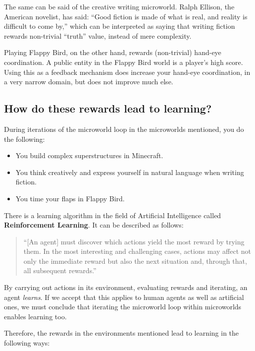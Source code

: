 The same can be said of the creative writing microworld. Ralph Ellison, the American novelist, has said: ``Good
fiction is made of what is real, and reality is difficult to come by,''
which can be interpreted as saying that writing fiction rewards non-trivial ``truth'' value, instead of mere complexity.

Playing Flappy Bird, on the other hand, rewards (non-trivial) hand-eye coordination. A public entity in the
Flappy Bird world is a player's high score. Using this as a
feedback mechanism does increase your hand-eye coordination, in a very narrow domain,
but does not improve much else. 

\subsection{How do these rewards lead to learning?}

During iterations of the microworld loop in the microworlds mentioned, you do the following:

\begin{itemize}

\item You build complex superstructures in Minecraft\cite{local:minecraft}.
\item You think creatively and express yourself in natural language when writing fiction\cite{neural}.
\item You time your flaps in Flappy Bird.

\end{itemize}

There is a learning algorithm in the field of Artificial Intelligence called \textbf{Reinforcement Learning}. It can be described as follows:

\begin{quote}
``[An agent] must discover which actions yield the most reward by trying them. In the most interesting and challenging cases, actions may affect not only the immediate reward but also the next situation and, through that, all subsequent rewards.''\cite{reinforcement}
\end{quote}

By carrying out actions in its environment, evaluating rewards and iterating, an agent \emph{learns}. If we accept that this applies to human agents as well as artificial ones, we must conclude that iterating the microworld loop within microworlds enables learning too.

Therefore, the rewards in the environments mentioned lead to learning in the following ways:

